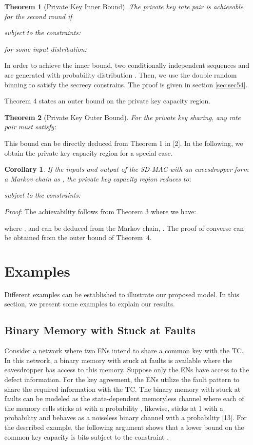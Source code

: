 \documentclass[conference,8pt]{IEEEtran}
\newtheorem{th1}{Theorem}
\newtheorem{corollary}{Corollary}
\begin{document}
{{{{\begin{th1}[Private Key Inner Bound]
The private key rate pair  is achievable for the second round if 

subject to the constraints:

for some input distribution:

\end{th1}
\begin{IEEEproof} In order to achieve the inner bound, two conditionally independent sequences  and  are generated with probability distribution . Then, we use the double random binning to satisfy the secrecy constrains. The proof is given in section \ref{sec:sec54}.
\end{IEEEproof} Theorem 4 states an outer bound on the private key capacity region.


\begin{th1}[Private Key Outer Bound]
For the private key sharing, any rate pair  must satisfy:

\end{th1}
This bound can be directly deduced from Theorem 1 in [2].
In the following, we obtain the private key capacity region for a special case.
\begin{corollary}
If the inputs and output of the SD-MAC with an eavesdropper form a Markov chain as       , the private key capacity region reduces to:

subject to the constraints:

\end{corollary}
\emph{Proof}: The achievability follows from Theorem 3 where we have:

where ,  and  can be deduced from the Markov chain,       . The proof of converse can be obtained from the outer bound of Theorem~4.
}
}
\section{Examples} 
Different examples can be established to illustrate our proposed model. In this section, we present some examples to explain our results.

\subsection{Binary Memory with Stuck at Faults}
Consider a network where two ENs intend to share a common key  with the TC. In this network, a binary memory with stuck at faults is available where the eavesdropper has access to this memory. Suppose only the ENs have access to the defect information. For the key agreement, the ENs utilize the fault pattern to share the required information with the TC. The binary memory with stuck at faults can be modeled as the state-dependent memoryless channel where each of the memory cells sticks at  with a probability , likewise, sticks at 1 with a probability  and behaves as a noiseless binary channel with a probability  [13]. For the described example, the following argument shows that a lower bound on the common key capacity is  bits subject to the constraint . \\

}}
\end{document}
